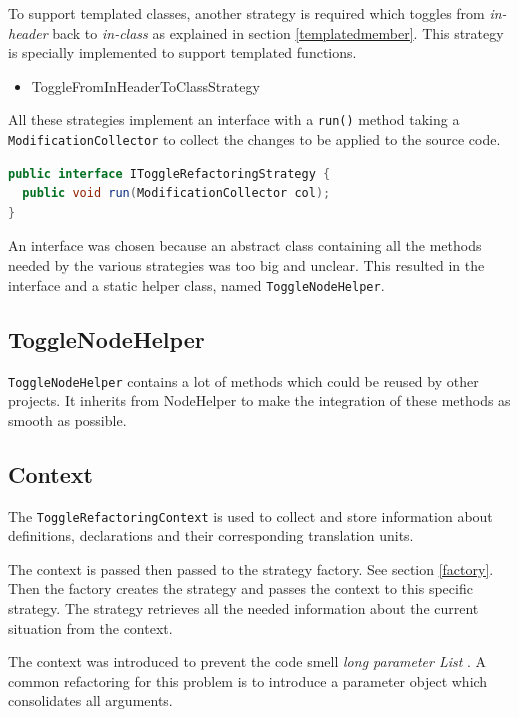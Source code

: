 To support templated classes, another strategy is required which toggles from
\textit{in-header} back to \textit{in-class} as explained in section
\ref{templatedmember}. This strategy is specially implemented to support
templated functions.

\begin{itemize}
\item ToggleFromInHeaderToClassStrategy
\end{itemize}

All these strategies implement an interface with a \texttt{run()} method taking
a \texttt{ModificationCollector} to collect the changes to be applied to the 
source code.

\begin{lstlisting}[caption={IToggleRefactoringStrategy},
label={01templatedMember}, language=Java]
public interface IToggleRefactoringStrategy {
  public void run(ModificationCollector col);
}
\end{lstlisting}

An interface was chosen because an abstract class containing all the methods
needed by the various strategies was too big and unclear. This resulted in the
interface and a static helper class, named \texttt{ToggleNodeHelper}.

\subsection{ToggleNodeHelper}

\texttt{ToggleNodeHelper} contains a lot of methods which could be reused by
other projects. It inherits from NodeHelper to make the integration of these
methods as smooth as possible.

\subsection{Context}

The \texttt{ToggleRefactoringContext} is used to collect and store information 
about definitions, declarations and their corresponding translation units.

The context is passed then passed to the strategy factory. See section
\ref{factory}. Then the factory creates the strategy and passes the context to
this specific strategy. The strategy retrieves all the needed information about
the current situation from the context.

The context was introduced to prevent the code smell \textit{long parameter
List} \cite{Refactoring}. A common refactoring for this problem is to
introduce a parameter object which consolidates all arguments.

